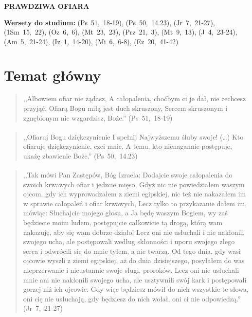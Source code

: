 \documentclass[10pt,a4paper,oneside]{article}
\begin{document}
\centerline{\textbf{\MakeUppercase{Prawdziwa ofiara}}}
\begin{center}
\textbf{Wersety do studium:} 
\mbox{(Ps 51, 18-19)}, \mbox{(Ps 50, 14.23)}, \mbox{(Jr 7, 21-27)}, \mbox{(1Sm 15, 22)}, \mbox{(Oz 6, 6)}, \mbox{(Mt 23, 23)}, \mbox{(Prz 21, 3)}, \mbox{(Mt 9, 13)}, \mbox{(J 4, 23-24)}, \mbox{(Am 5, 21-24)}, \mbox{(Iz 1, 14-20)}, \mbox{(Mi 6, 6-8)}, \mbox{(Ez 20, 41-42)}
\end{center}
\section{Temat główny}
\paragraph{}
\begin{quote}
,,Albowiem ofiar nie żądasz, A całopalenia, choćbym ci je dał, nie zechcesz przyjąć. Ofiarą Bogu miłą jest duch skruszony, Sercem skruszonym i zgnębionym nie wzgardzisz, Boże.'' \mbox{(Ps 51, 18-19)}
\end{quote}
\paragraph{}
\begin{quote}
,,Ofiaruj Bogu dziękczynienie I spełnij Najwyższemu śluby swoje! (\ldots) Kto ofiaruje dziękczynienie, czci mnie, A temu, kto nienagannie postępuje, ukażę zbawienie Boże.'' \mbox{(Ps 50, 14.23)}
\end{quote}
\paragraph{}
\begin{quote}
,,Tak mówi Pan Zastępów, Bóg Izraela: Dodajcie swoje całopalenia do swoich krwawych ofiar i jedzcie mięso, Gdyż nic nie powiedziałem waszym ojcom, gdy ich wyprowadzałem z ziemi egipskiej, nic też nie nakazałem im w sprawie całopaleń i ofiar krwawych, Lecz tylko to przykazanie dałem im, mówiąc: Słuchajcie mojego głosu, a Ja będę waszym Bogiem, wy zaś będziecie moim ludem, postępujcie całkowicie tą drogą, którą wam nakazuję, aby się wam dobrze działo! Lecz oni nie usłuchali i nie nakłonili swojego ucha, ale postępowali według skłonności i uporu swojego złego serca i odwrócili się do mnie tyłem, a nie twarzą. Od tego dnia, gdy wasi ojcowie wyszli z ziemi egipskiej, aż do dnia dzisiejszego, posyłałem do was nieprzerwanie i nieustannie swoje sługi, proroków. Lecz oni nie usłuchali mnie ani nie nakłonili swojego ucha, ale usztywnili swój kark i postępowali gorzej niż ich ojcowie. Gdy więc będziesz mówił do nich wszystkie te słowa, oni cię nie usłuchają, gdy będziesz do nich wołał, oni ci nie odpowiedzą.'' \mbox{(Jr 7, 21-27)}
\end{quote}
\end{document}
